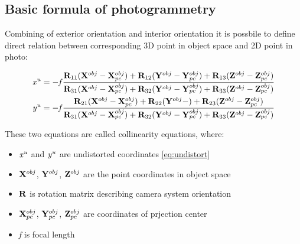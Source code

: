 \documentclass[a4paper,12pt]{report}
\newcommand{\ematr}[1]{
{\bf #1}
}
\newcommand{\evect}[1]{
{\bf #1}
}
\newcommand{\escal}[1]{
{\it #1}
}
\begin{document}
\subsection{Basic formula of photogrammetry}

Combining of exterior orientation and interior orientation it is possbile to define 
direct relation between corresponding 3D point in object space and 2D point
in photo:

\begin{equation}
\label{eq:col_eqs}
\begin{split}
&\escal{x}^{u} = -\escal{f}\frac{\ematr{R}_{11}(\evect{X}^{obj} - \evect{X}^{obj}_{pc}) + 
                                  \ematr{R}_{12}(\evect{Y}^{obj} - \evect{Y}^{obj}_{pc}) + 
                                  \ematr{R}_{13}(\evect{Z}^{obj} - \evect{Z}^{obj}_{pc})                                  
                                  }{
				  \ematr{R}_{31}(\evect{X}^{obj} - \evect{X}^{obj}_{pc}) + 
                                  \ematr{R}_{32}(\evect{Y}^{obj} - \evect{Y}^{obj}_{pc}) + 
                                  \ematr{R}_{33}(\evect{Z}^{obj} - \evect{Z}^{obj}_{pc})     
                                  } \\
&\escal{y}^{u} = -\escal{f}\frac{\ematr{R}_{21}(\evect{X}^{obj} - \evect{X}^{obj}_{pc}) + 
                                  \ematr{R}_{22}(\evect{Y}^{obj} - ) + 
                                  \ematr{R}_{23}(\evect{Z}^{obj} - \evect{Z}^{obj}_{pc})                                  
                                  }{
				  \ematr{R}_{31}(\evect{X}^{obj} - \evect{X}^{obj}_{pc}) + 
                                  \ematr{R}_{32}(\evect{Y}^{obj} - \evect{Y}^{obj}_{pc}) + 
                                  \ematr{R}_{33}(\evect{Z}^{obj} - \evect{Z}^{obj}_{pc})     
                                  }
\end{split}
\end{equation}

These two equations are called collinearity equations, where:
\begin{itemize}
  \item $\escal{x}^{u}$ and $\escal{y}^{u}$ are undistorted coordinates \eqref{eq:undistort}
  \item $\evect{X}^{obj}$, $\evect{Y}^{obj}$, $\evect{Z}^{obj}$ are the point coordinates in object space
  \item $\ematr{R}$ is rotation matrix describing camera system orientation
  \item $\evect{X}^{obj}_{pc}$, $\evect{Y}^{obj}_{pc}$, $\evect{Z}^{obj}_{pc}$ are coordinates of prjection center
  \item \escal{f} is focal length
\end{itemize}
\end{document}
